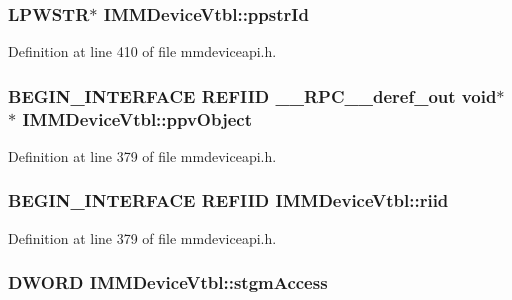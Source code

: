 \subsubsection[{\texorpdfstring{ppstr\+Id}{ppstrId}}]{ {\bf L\+P\+W\+S\+TR}$\ast$ I\+M\+M\+Device\+Vtbl\+::ppstr\+Id}\hypertarget{struct_i_m_m_device_vtbl_ab91717dfe263341efb394f659beba849}{}\label{struct_i_m_m_device_vtbl_ab91717dfe263341efb394f659beba849}


Definition at line 410 of file mmdeviceapi.\+h.

\subsubsection[{\texorpdfstring{ppv\+Object}{ppvObject}}]{\setlength{\rightskip}{0pt plus 5cm}B\+E\+G\+I\+N\+\_\+\+I\+N\+T\+E\+R\+F\+A\+CE {\bf R\+E\+F\+I\+ID} {\bf \+\_\+\+\_\+\+R\+P\+C\+\_\+\+\_\+deref\+\_\+out} {\bf void}$\ast$$\ast$ I\+M\+M\+Device\+Vtbl\+::ppv\+Object}\hypertarget{struct_i_m_m_device_vtbl_a857e5b97ff19642e248b3135fdfa26be}{}\label{struct_i_m_m_device_vtbl_a857e5b97ff19642e248b3135fdfa26be}


Definition at line 379 of file mmdeviceapi.\+h.

\subsubsection[{\texorpdfstring{riid}{riid}}]{\setlength{\rightskip}{0pt plus 5cm}B\+E\+G\+I\+N\+\_\+\+I\+N\+T\+E\+R\+F\+A\+CE {\bf R\+E\+F\+I\+ID} I\+M\+M\+Device\+Vtbl\+::riid}\hypertarget{struct_i_m_m_device_vtbl_ab2f2cec2a203b8979bbbc974e94e95d3}{}\label{struct_i_m_m_device_vtbl_ab2f2cec2a203b8979bbbc974e94e95d3}


Definition at line 379 of file mmdeviceapi.\+h.

\subsubsection[{\texorpdfstring{stgm\+Access}{stgmAccess}}]{ {\bf D\+W\+O\+RD} I\+M\+M\+Device\+Vtbl\+::stgm\+Access}\hypertarget{struct_i_m_m_device_vtbl_a33db0acdefd757e708c9089db7cd8004}{}\label{struct_i_m_m_device_vtbl_a33db0acdefd757e708c9089db7cd8004}


